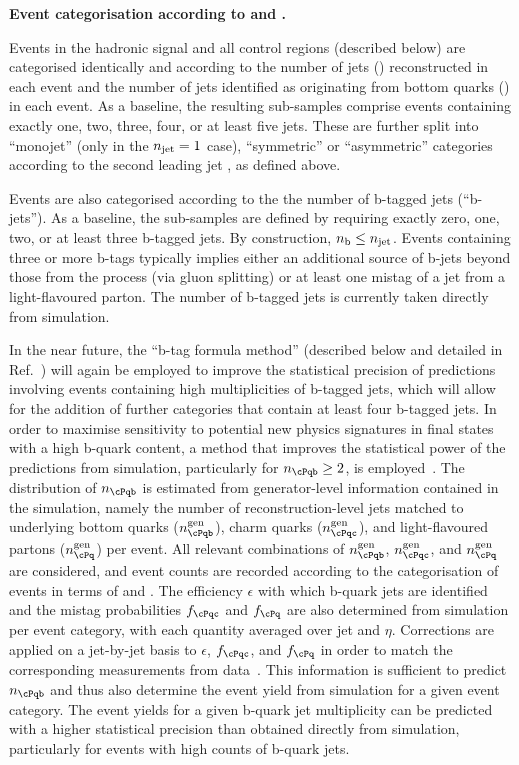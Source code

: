 {\bf Event categorisation according to \njet and \nb.} 

Events in the hadronic signal and all control regions (described
below) are categorised identically and according to the number of jets
(\njet) reconstructed in each event and the number of jets identified
as originating from bottom quarks (\nb) in each event. As a baseline,
the resulting sub-samples comprise events containing exactly one, two,
three, four, or at least five jets. These are further split into
``monojet'' (only in the $n_{\text{jet}}=1$ case),
``symmetric'' or ``asymmetric'' \njet categories according to the
second leading jet \Pt, as defined above.

Events are also categorised according to the the number of b-tagged
jets (``b-jets''). As a baseline, the sub-samples are defined by
requiring exactly zero, one, two, or at least three b-tagged jets. By
construction, $n_{\text{b}} \leq n_{\text{jet}}$. Events containing three or more b-tags
typically implies either an additional source of b-jets beyond those
from the \ttbar process (\eg via gluon splitting) or at least one
mistag of a jet from a light-flavoured parton. The number of b-tagged
jets is currently taken directly from simulation.

In the near future, the ``b-tag formula method'' (described below and
detailed in Ref.~\cite{Chatrchyan:2013lya}) will again be employed to
improve the statistical precision of predictions involving events
containing high multiplicities of b-tagged jets, which will allow for
the addition of further categories that contain at least four b-tagged
jets. In order to maximise sensitivity to potential new physics
signatures in final states with a high b-quark content, a method that
improves the statistical power of the predictions from simulation,
particularly for $n_\cPqb \ge 2$, is employed~\cite{Chatrchyan:2013lya}. The
distribution of $n_\cPqb$ is estimated from generator-level
information contained in the simulation, namely the number of
reconstruction-level jets matched to underlying bottom quarks
($n_\cPqb^\text{gen}$), charm quarks ($n_\cPqc^\text{gen}$), and
light-flavoured partons ($n_\cPq^\text{gen}$) per event. All relevant
combinations of $n_\cPqb^{\rm gen}$, $n_\cPqc^{\rm gen}$, and
$n_{\cPq}^{\rm gen}$ are considered, and event counts are recorded
according to the categorisation of events in terms of \njet and
\scalht. The efficiency $\epsilon$ with which b-quark jets are
identified and the mistag probabilities $f_\cPqc$ and $f_\cPq$ are
also determined from simulation per event category, with each quantity
averaged over jet \pt and $\eta$. Corrections are applied on a
jet-by-jet basis to $\epsilon$, $f_\cPqc$, and $f_\cPq$ in order to
match the corresponding measurements from
data~\cite{Chatrchyan:2012jua}. This information is sufficient to
predict $n_\cPqb$ and thus also determine the event yield from
simulation for a given event category. The event yields for a given
b-quark jet multiplicity can be predicted with a higher statistical
precision than obtained directly from simulation, particularly for
events with high counts of b-quark jets.


